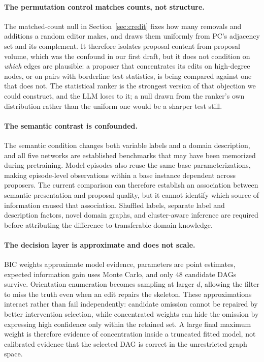 \documentclass{article}
\begin{document}
\paragraph{The permutation control matches counts, not structure.}
The matched-count null in Section~\ref{sec:credit} fixes how many removals and additions a random
editor makes, and draws them uniformly from PC's adjacency set and its complement. It therefore
isolates proposal content from proposal volume, which was the confound in our first draft, but it
does not condition on \emph{which} edges are plausible: a proposer that concentrates its edits on
high-degree nodes, or on pairs with borderline test statistics, is being compared against one that
does not. The statistical ranker is the strongest version of that objection we could construct, and
the LLM loses to it; a null drawn from the ranker's own distribution rather than the uniform one
would be a sharper test still.

\paragraph{The semantic contrast is confounded.}
The semantic condition changes both variable labels and a domain description, and all five networks
are established benchmarks that may have been memorized during pretraining. Model episodes also
reuse the same base parameterizations, making episode-level observations within a base instance
dependent across proposers. The current comparison can therefore establish an association between
semantic presentation and proposal quality, but it cannot identify which source of information
caused that association. Shuffled labels, separate label and description factors, novel domain
graphs, and cluster-aware inference are required before attributing the difference to transferable
domain knowledge.

\paragraph{The decision layer is approximate and does not scale.}
BIC weights approximate model evidence, parameters are point estimates, expected information gain
uses Monte Carlo, and only $48$ candidate DAGs survive. Orientation enumeration becomes sampling at
larger $d$, allowing the filter to miss the truth even when an edit repairs the skeleton. These
approximations interact rather than fail independently: candidate omission cannot be repaired by
better intervention selection, while concentrated weights can hide the omission by expressing high
confidence only within the retained set. A large final maximum weight is therefore evidence of
concentration inside a truncated fitted model, not calibrated evidence that the selected DAG is
correct in the unrestricted graph space.
\end{document}
